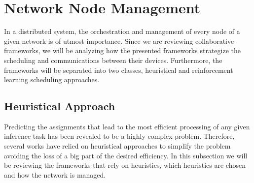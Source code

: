 \section{Network Node Management} \label{sec:se32}

In a distributed system, the orchestration and management of every node of a
given network is of utmost importance. Since we are reviewing collaborative
frameworks, we will be analyzing how the presented frameworks strategize the 
scheduling and communications between their devices. Furthermore, the frameworks 
will be separated into two classes, heuristical and reinforcement learning 
scheduling approaches.

\subsection{Heuristical Approach} \label{sec:se321}

Predicting the assignments that lead to the most efficient processing of any
given inference task has been revealed to be a highly complex problem. Therefore,
several works have relied on heuristical approaches to simplify the problem
avoiding the loss of a big part of the desired efficiency. In this subsection
we will be reviewing the frameworks that rely on heuristics, which heuristics are
chosen and how the network is managed.

